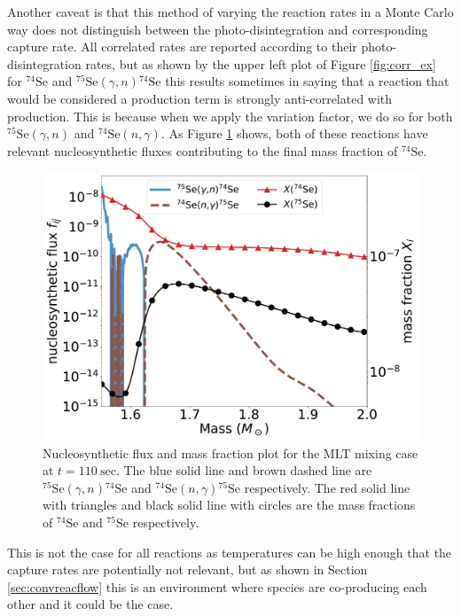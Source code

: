 Another caveat is that this method of varying the reaction rates in a Monte Carlo way does not distinguish between the photo-disintegration and corresponding capture rate.
All correlated rates are reported according to their photo-disintegration rates, but as shown by the upper left plot of Figure \ref{fig:corr_ex} for $^{74}\mathrm{Se}$ and $^{75}\mathrm{Se}(\gamma,n)$$^{74}\mathrm{Se}$ this results sometimes in saying that a reaction that would be considered a production term is strongly anti-correlated with production.
This is because when we apply the variation factor, we do so for both $^{75}\mathrm{Se}(\gamma,n)$ and $^{74}\mathrm{Se}(n,\gamma)$.
As Figure \ref{fig:se74_example} shows, both of these reactions have relevant nucleosynthetic fluxes contributing to the final mass fraction of $^{74}\mathrm{Se}$.

\begin{figure}[!htbp]
\includegraphics[width=\textwidth]{chapters/2/figures/Se74_example.pdf}
\caption{Nucleosynthetic flux and mass fraction plot for the MLT mixing case at $t=110~\mathrm{sec}$. The blue solid line and brown dashed line are $^{75}\mathrm{Se}(\gamma,n)$$^{74}\mathrm{Se}$ and $^{74}\mathrm{Se}(n,\gamma)$$^{75}\mathrm{Se}$ respectively. The red solid line with triangles and black solid line with circles are the mass fractions of $^{74}\mathrm{Se}$ and $^{75}\mathrm{Se}$ respectively.
\label{fig:se74_example}}
\end{figure}

This is not the case for all reactions as temperatures can be high enough that the capture rates are potentially not relevant, but as shown in Section \ref{sec:convreacflow} this is an environment where species are co-producing each other and it could be the case.
